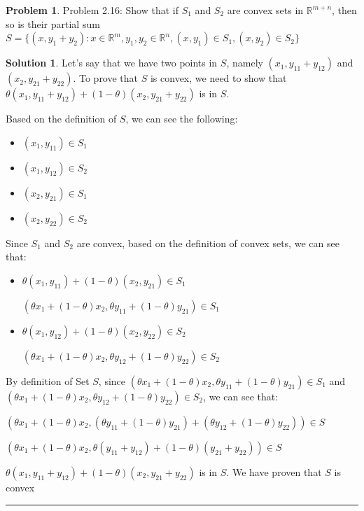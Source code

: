 \documentclass{article}
\theoremstyle{definition}
\newtheorem{problem}{Problem}
\def\fline{\rule{0.75\linewidth}{0.5pt}}
\newcommand{\finishline}{\begin{center}\fline\end{center}}
\newtheorem*{solution*}{Solution}
\newenvironment{solution}{\begin{solution*}}{{\finishline} \end{solution*}}
\begin{document}
\begin{problem}
Problem 2.16: \newline 
    Show that if $S_1$ and $S_2$ are convex sets in $\mathbb{R}^{m + n}$, then so is their partial sum \newline 
    $S = \{(x, y_1 + y_2) : x \in \mathbb{R}^m, y_1, y_2 \in \mathbb{R}^n, (x, y_1) \in S_1, (x, y_2) \in S_2 \}$

    \begin{solution}

    Let's say that we have two points in $S$, namely $(x_1, y_{11} + y_{12})$ and $(x_2, y_{21} + y_{22})$. To prove that $S$ is convex, we need to show that $\theta (x_1, y_{11} + y_{12}) + (1 - \theta) (x_2, y_{21} + y_{22})$ is in $S$.  

    Based on the definition of $S$, we can see the following: 
    \begin{itemize}
        \item $(x_1, y_{11}) \in S_1$
        \item $(x_1, y_{12}) \in S_2$
        \item $(x_2, y_{21}) \in S_1$
        \item $(x_2, y_{22}) \in S_2$
    \end{itemize}

    Since $S_1$ and $S_2$ are convex, based on the definition of convex sets, we can see that:
    \begin{itemize}
        \item $\theta (x_1, y_{11}) + (1 - \theta) (x_2, y_{21}) \in S_1$

        $ (\theta x_1 + (1 - \theta) x_2, \theta y_{11} + (1 - \theta) y_{21} ) \in S_1$
        \item $\theta (x_1, y_{12})  + (1 - \theta)(x_2, y_{22}) \in S_2$

        $ (\theta x_1 + (1 - \theta) x_2, \theta y_{12} + (1 - \theta) y_{22} ) \in S_2$
    \end{itemize}

    By definition of Set $S$, since $ (\theta x_1 + (1 - \theta) x_2, \theta y_{11} + (1 - \theta) y_{21} ) \in S_1$ and $ (\theta x_1 + (1 - \theta) x_2, \theta y_{12} + (1 - \theta) y_{22} ) \in S_2$, we can see that: \newline 

    $ (\theta x_1 + (1 - \theta) x_2, (\theta y_{11} + (1 - \theta) y_{21}) + (\theta y_{12} + (1 - \theta) y_{22}) ) \in S$ \newline 

        $ (\theta x_1 + (1 - \theta) x_2, \theta (y_{11} + y_{12}) + (1 - \theta) (y_{21} + y_{22}) ) \in S$ \newline 

$\theta (x_1, y_{11} + y_{12}) + (1 - \theta) (x_2, y_{21} + y_{22})$ is in $S$.  We have proven that $S$ is convex
    
        
    \end{solution}
\end{problem}
\end{document}
